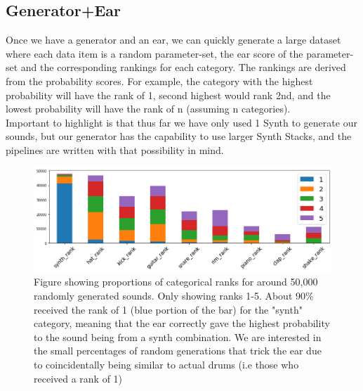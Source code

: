 \documentclass{nime-alternate} %
\begin{document}
\subsection{Generator+Ear}
Once we have a generator and an ear, we can quickly generate a large dataset where each data item is a random parameter-set, the ear score of the parameter-set and the corresponding rankings for each category. The rankings are derived from the probability scores. For example, the category with the highest probability will have the rank of 1, second highest would rank 2nd, and the lowest probability will have the rank of n (assuming n categories).\\
Important to highlight is that thus far we have only used 1 Synth to generate our sounds, but our generator has the capability to use larger Synth Stacks, and the pipelines are written with that possibility in mind.\\
\begin{figure}[h!]
\centering
\includegraphics[width=1\linewidth]{images/random_ranks.png}
\caption{Figure showing proportions of categorical ranks for around 50,000 randomly generated sounds. Only showing ranks 1-5. About 90\% received the rank of 1 (blue portion of the bar) for the "synth" category, meaning that the ear correctly gave the highest probability to the sound being from a synth combination. We are interested in the small percentages of random generations that trick the ear due to coincidentally being similar to actual drums (i.e those who received a rank of 1) }


\label{fig:rank portions}
\end{figure}
\end{document}
